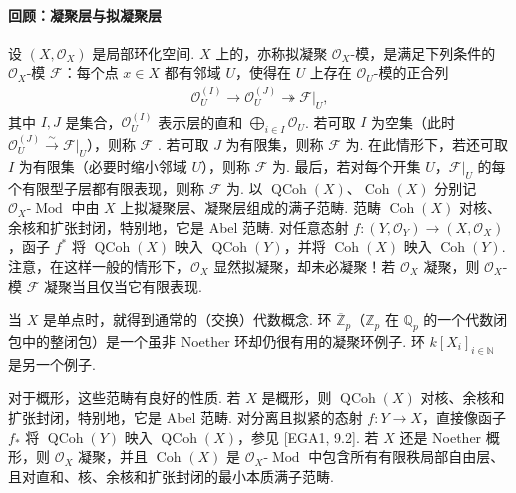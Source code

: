 \paragraph{回顾：凝聚层与拟凝聚层}
设 $(X,\mathcal O_X)$ 是局部环化空间. $X$ 上的，亦称拟凝聚 $\mathcal O_X$-模，是满足下列条件的 $\mathcal O_X$-模 $\mathcal F$：每个点 $x\in X$ 都有邻域 $U$，使得在 $U$ 上存在 $\mathcal O_U$-模的正合列
\begin{align*}
\mathcal O_U^{(I)}\longrightarrow\mathcal O_U^{(J)}\twoheadrightarrow\mathcal F|_U,
\end{align*}
其中 $I,J$ 是集合，$\mathcal O_U^{(I)}$ 表示层的直和 $\bigoplus_{i\in I}\mathcal O_U$. 若可取 $I$ 为空集（此时 $\mathcal O_U^{(J)}\xrightarrow{\sim}\mathcal F|_U$），则称 $\mathcal F$ . 若可取 $J$ 为有限集，则称 $\mathcal F$ 为. 在此情形下，若还可取 $I$ 为有限集（必要时缩小邻域 $U$），则称 $\mathcal F$ 为. 最后，若对每个开集 $U$，$\mathcal F|_U$ 的每个有限型子层都有限表现，则称 $\mathcal F$ 为. 以 $\operatorname{QCoh}(X)$、$\operatorname{Coh}(X)$ 分别记 $\mathcal O_X\text{-}\operatorname{Mod}$ 中由 $X$ 上拟凝聚层、凝聚层组成的满子范畴. 范畴 $\operatorname{Coh}(X)$ 对核、余核和扩张封闭，特别地，它是 Abel 范畴. 对任意态射 $f:(Y,\mathcal O_Y)\longrightarrow(X,\mathcal O_X)$，函子 $f^*$ 将 $\operatorname{QCoh}(X)$ 映入 $\operatorname{QCoh}(Y)$，并将 $\operatorname{Coh}(X)$ 映入 $\operatorname{Coh}(Y)$. 注意，在这样一般的情形下，$\mathcal O_X$ 显然拟凝聚，却未必凝聚！若 $\mathcal O_X$ 凝聚，则 $\mathcal O_X$-模 $\mathcal F$ 凝聚当且仅当它有限表现.

\begin{example*}
当 $X$ 是单点时，就得到通常的（交换）代数概念. 环 $\overline{\mathbb Z}_p$（$\mathbb Z_p$ 在 $\mathbb Q_p$ 的一个代数闭包中的整闭包）是一个虽非 Noether 环却仍很有用的凝聚环例子. 环 $k[X_i]_{i\in\mathbb N}$ 是另一个例子.
\end{example*}
对于概形，这些范畴有良好的性质. 若 $X$ 是概形，则 $\operatorname{QCoh}(X)$ 对核、余核和扩张封闭，特别地，它是 Abel 范畴. 对分离且拟紧的态射 $f:Y\longrightarrow X$，直接像函子 $f_*$ 将 $\operatorname{QCoh}(Y)$ 映入 $\operatorname{QCoh}(X)$，参见 [EGA1, 9.2]. 若 $X$ 还是 Noether 概形，则 $\mathcal O_X$ 凝聚，并且 $\operatorname{Coh}(X)$ 是 $\mathcal O_X\text{-}\operatorname{Mod}$ 中包含所有有限秩局部自由层、且对直和、核、余核和扩张封闭的最小本质满子范畴.

